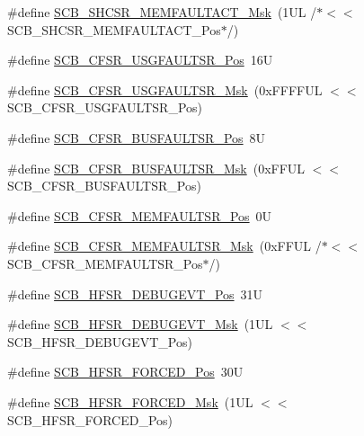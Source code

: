 \begin{DoxyCompactItemize}
\item 
\#define \hyperlink{group___c_m_s_i_s___s_c_b_ga9147fd4e1b12394ae26eadf900a023a3}{S\+C\+B\+\_\+\+S\+H\+C\+S\+R\+\_\+\+M\+E\+M\+F\+A\+U\+L\+T\+A\+C\+T\+\_\+\+Msk}~(1\+U\+L /$\ast$$<$$<$ S\+C\+B\+\_\+\+S\+H\+C\+S\+R\+\_\+\+M\+E\+M\+F\+A\+U\+L\+T\+A\+C\+T\+\_\+\+Pos$\ast$/)
\item 
\#define \hyperlink{group___c_m_s_i_s___s_c_b_gac8e4197b295c8560e68e2d71285c7879}{S\+C\+B\+\_\+\+C\+F\+S\+R\+\_\+\+U\+S\+G\+F\+A\+U\+L\+T\+S\+R\+\_\+\+Pos}~16U
\item 
\#define \hyperlink{group___c_m_s_i_s___s_c_b_ga565807b1a3f31891f1f967d0fa30d03f}{S\+C\+B\+\_\+\+C\+F\+S\+R\+\_\+\+U\+S\+G\+F\+A\+U\+L\+T\+S\+R\+\_\+\+Msk}~(0x\+F\+F\+F\+F\+U\+L $<$$<$ S\+C\+B\+\_\+\+C\+F\+S\+R\+\_\+\+U\+S\+G\+F\+A\+U\+L\+T\+S\+R\+\_\+\+Pos)
\item 
\#define \hyperlink{group___c_m_s_i_s___s_c_b_ga555a24f4f57d199f91d1d1ab7c8c3c8a}{S\+C\+B\+\_\+\+C\+F\+S\+R\+\_\+\+B\+U\+S\+F\+A\+U\+L\+T\+S\+R\+\_\+\+Pos}~8U
\item 
\#define \hyperlink{group___c_m_s_i_s___s_c_b_ga26dc1ddfdc37a6b92597a6f7e498c1d6}{S\+C\+B\+\_\+\+C\+F\+S\+R\+\_\+\+B\+U\+S\+F\+A\+U\+L\+T\+S\+R\+\_\+\+Msk}~(0x\+F\+F\+U\+L $<$$<$ S\+C\+B\+\_\+\+C\+F\+S\+R\+\_\+\+B\+U\+S\+F\+A\+U\+L\+T\+S\+R\+\_\+\+Pos)
\item 
\#define \hyperlink{group___c_m_s_i_s___s_c_b_ga91f41491cec5b5acca3fbc94efbd799e}{S\+C\+B\+\_\+\+C\+F\+S\+R\+\_\+\+M\+E\+M\+F\+A\+U\+L\+T\+S\+R\+\_\+\+Pos}~0U
\item 
\#define \hyperlink{group___c_m_s_i_s___s_c_b_gad46716159a3808c9e7da22067d6bec98}{S\+C\+B\+\_\+\+C\+F\+S\+R\+\_\+\+M\+E\+M\+F\+A\+U\+L\+T\+S\+R\+\_\+\+Msk}~(0x\+F\+F\+U\+L /$\ast$$<$$<$ S\+C\+B\+\_\+\+C\+F\+S\+R\+\_\+\+M\+E\+M\+F\+A\+U\+L\+T\+S\+R\+\_\+\+Pos$\ast$/)
\item 
\#define \hyperlink{group___c_m_s_i_s___s_c_b_ga300c90cfb7b35c82b4d44ad16c757ffb}{S\+C\+B\+\_\+\+H\+F\+S\+R\+\_\+\+D\+E\+B\+U\+G\+E\+V\+T\+\_\+\+Pos}~31U
\item 
\#define \hyperlink{group___c_m_s_i_s___s_c_b_gababd60e94756bb33929d5e6f25d8dba3}{S\+C\+B\+\_\+\+H\+F\+S\+R\+\_\+\+D\+E\+B\+U\+G\+E\+V\+T\+\_\+\+Msk}~(1\+U\+L $<$$<$ S\+C\+B\+\_\+\+H\+F\+S\+R\+\_\+\+D\+E\+B\+U\+G\+E\+V\+T\+\_\+\+Pos)
\item 
\#define \hyperlink{group___c_m_s_i_s___s_c_b_gab361e54183a378474cb419ae2a55d6f4}{S\+C\+B\+\_\+\+H\+F\+S\+R\+\_\+\+F\+O\+R\+C\+E\+D\+\_\+\+Pos}~30U
\item 
\#define \hyperlink{group___c_m_s_i_s___s_c_b_ga6560d97ed043bc01152a7247bafa3157}{S\+C\+B\+\_\+\+H\+F\+S\+R\+\_\+\+F\+O\+R\+C\+E\+D\+\_\+\+Msk}~(1\+U\+L $<$$<$ S\+C\+B\+\_\+\+H\+F\+S\+R\+\_\+\+F\+O\+R\+C\+E\+D\+\_\+\+Pos)

\end{DoxyCompactItemize}
